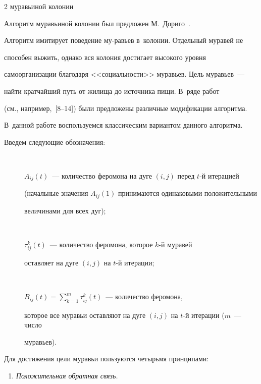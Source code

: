 \begin{multicols}{2}
{муравьиной колонии}



     Алгоритм муравьиной колонии был предложен М.~Дориго~\cite{7-va}.

Алгоритм имитирует поведение му-\linebreak равьев в~колонии. Отдельный муравей не

\mbox{способен} выжить, однако вся колония достигает высокого уровня

самоорганизации благодаря <<со\-ци\-аль\-ности>> муравьев. Цель муравьев~---

найти кратчайший путь от жилища до источника пищи. В~ряде работ

(см., например,~[8--14]) были предложены различные модификации алгоритма.

В~данной работе воспользуемся классическим вариантом данного алгоритма.



     Введем следующие обозначения:

\begin{description}

\item[\,]     $A_{ij}(t)$~--- количество феромона на дуге $(i, j)$ перед $t$-й итерацией

(начальные значения $A_{ij}(1)$ принимаются одинаковыми положительными

величинами для всех дуг);

\item[\,]

     $\tau_{ij}^k(t)$~--- количество феромона, которое $k$-й муравей

оставляет на дуге $(i,j)$ на $t$-й итерации;

\item[\,]

     $B_{ij}(t)=\sum\nolimits_{k=1}^m \tau_{ij}^k(t)$~--- количество феромона,

которое все муравьи оставляют на дуге $(i,j)$ на $t$-й итерации ($m$~--- число

муравьев).

\end{description}



     Для достижения цели муравьи пользуются четырьмя принципами:

     \begin{enumerate}[1.]

\item \textit{Положительная обратная связь. }


\end{enumerate}
\end{multicols}
